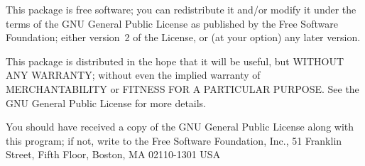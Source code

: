 \documentclass[pagesize=auto]{scrartcl}
\begin{document}
This package is free software; you can redistribute it and/or modify
it under the terms of the GNU General Public License as published by
the Free Software Foundation; either version~2 of the License, or
(at your option) any later version.

This package is distributed in the hope that it will be useful,
but WITHOUT ANY WARRANTY; without even the implied warranty of
MERCHANTABILITY or FITNESS FOR A PARTICULAR PURPOSE.  See the
GNU General Public License for more details.

You should have received a copy of the GNU General Public License
along with this program; if not, write to the Free Software
Foundation, Inc., 51 Franklin Street, Fifth Floor, Boston, MA  02110-1301  USA
\end{document}
